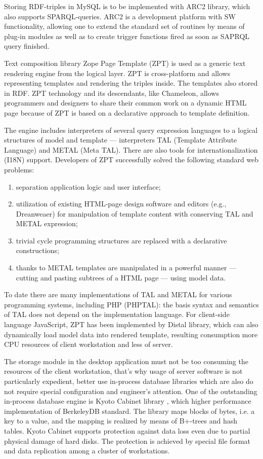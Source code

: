 \documentclass[conference]{IEEEtran}
\begin{document}
Storing RDF-triples in MySQL is to be implemented with ARC2 library,
which also supports SPARQL-queries.  ARC2 is a development platform
with SW functionality, allowing one to extend the standard set of
routines by means of plug-in modules as well as to create trigger
functions fired as soon as SAPRQL query finished.

Text composition library Zope Page Template (ZPT) is used as a generic
text rendering engine from the logical layer.  ZPT is cross-platform
and allows representing templates and rendering the triples inside.
The templates also stored in RDF.  ZPT technology and its descendants,
like Chameleon, allows programmers and designers to share their common
work on a dynamic HTML page because of ZPT is based on a declarative
approach to template definition.

The engine includes interpreters of several query expression languages
to a logical structures of model and template --- interpreters TAL
(Template Attribute Language) and METAL (Meta TAL).  There are also
tools for internationalization (I18N) support.  Developers of ZPT
successfully solved the following standard web problems:
\begin{enumerate}
\item separation application logic and user interface;
\item utilization of existing HTML-page design software and editors
  (e.g., Dreanweaer) for manipulation of template content with
  conserving TAL and METAL expression;
\item trivial cycle programming structures are replaced with a
  declarative constructions;
\item thanks to METAL templates are manipulated in a powerful manner
  --- cutting and pasting subtrees of a HTML page --- using model data.
\end{enumerate}

To date there are many implementations of TAL and METAL for various
programming systems, including PHP (PHPTAL): the basis syntax and
semantics of TAL does not depend on the implementation language.  For
client-side language JavaScript, ZPT has been implemented by Distal
library, which can also dynamically load model data into rendered
template, resulting consumption more CPU resources of client
workstation and less of server.

The storage module in the desktop application must not be too
consuming the resources of the client workstation, that's why usage of
server software is not particularly expedient, better use in-process
database libraries which are also do not require special configuration
and engineer's attention.  One of the outstanding in-process database
engine is Kyoto Cabinet library \cite{kyoto}, which higher performance
implementation of BerkeleyDB standard.  The library maps blocks of
bytes, i.e. a key to a value, and the mapping is realized by means of
B+-trees and hash tables.  Kyoto Cabinet supports protection against
data loss even due to partial physical damage of hard disks.  The
protection is achieved by special file format and data replication
among a cluster of workstations.
\end{document}
